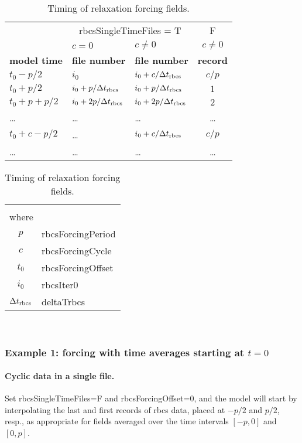 \begin{table}
    \centering
    \begin{tabular}{|l|l|l|c|}
      \hline 
      &
      \multicolumn{2}{|c|}{rbcsSingleTimeFiles = T} &
      F \\
      &
      \textbf{$c=0$} &
      \textbf{$c\ne0$} &
      \textbf{$c\ne0$}
      \\ \hline
      \textbf{model time} &
      \textbf{file number} &
      \textbf{file number} &
      \textbf{record} \\
      \hline \hline
        $t_0 -     p/2$ & $i_0$            & $i_0 +   c/\Delta t_{\text{rbcs}}$ & $c/p$ \\ \hline
        $t_0 +     p/2$ & $i_0 +   p/\Delta t_{\text{rbcs}}$ & $i_0 +   p/\Delta t_{\text{rbcs}}$ & $1$ \\ \hline
        $t_0 + p + p/2$ & $i_0 + 2 p/\Delta t_{\text{rbcs}}$ & $i_0 + 2 p/\Delta t_{\text{rbcs}}$ & $2$ \\ \hline
        \dots & \dots & \dots & \dots \\ \hline
        $t_0 + c - p/2$ & \dots            & $i_0 +   c/\Delta t_{\text{rbcs}}$ & $c/p$ \\ \hline
        \dots & \dots & \dots & \dots \\ \hline
    \end{tabular}
    \qquad
    \begin{tabular}{c@{${}={}$}l}
        \multicolumn{2}{l}{} \\[4ex]
        \multicolumn{2}{l}{where} \\[1ex]
        $p$    & rbcsForcingPeriod \\
        $c$    & rbcsForcingCycle \\
        $t_0$  & rbcsForcingOffset \\
        $i_0$  & rbcsIter0 \\
        $\Delta t_{\text{rbcs}}$ & deltaTrbcs \\
    \end{tabular}\\[3ex]
    \caption{Timing of relaxation forcing fields.}
    \label{tab:pkg:rbcs:timing}
\end{table}


\subsubsection{Example 1: forcing with time averages starting at $t=0$}

\paragraph{Cyclic data in a single file.}  Set rbcsSingleTimeFiles=F and
rbcsForcingOffset=0, and the model will start by interpolating the last and first
records of rbcs data, placed at $-p/2$ and $p/2$, resp., as appropriate for fields
averaged over the time intervals $[-p, 0]$ and $[0, p]$.

